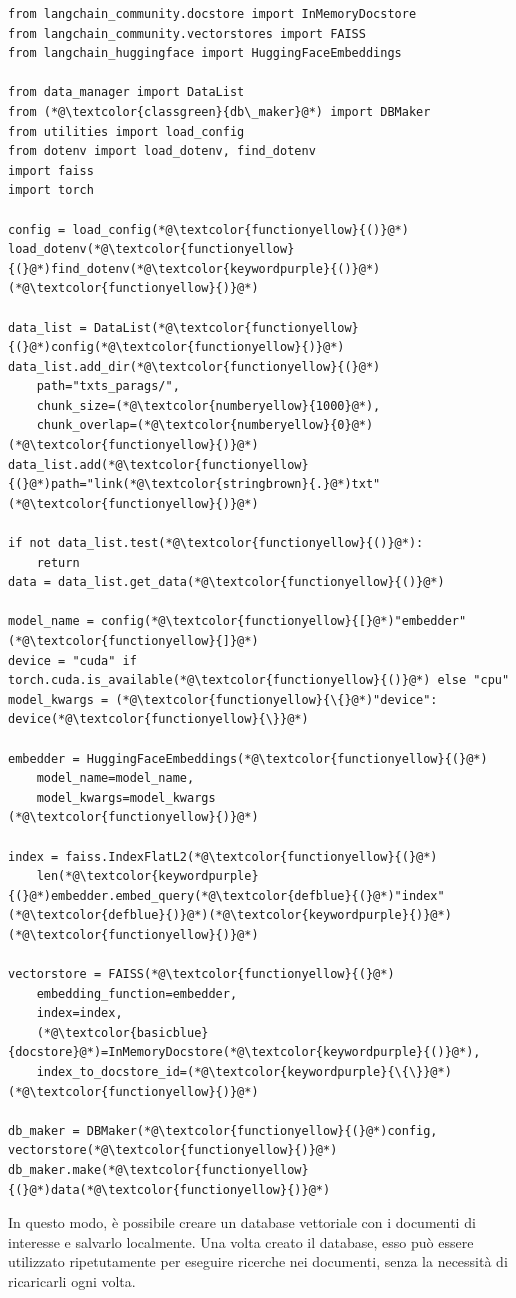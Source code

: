 \begin{lstlisting}[label=lst:loaddb, caption={Procedura di caricamento con DB Maker}]
from langchain_community.docstore import InMemoryDocstore
from langchain_community.vectorstores import FAISS
from langchain_huggingface import HuggingFaceEmbeddings

from data_manager import DataList
from (*@\textcolor{classgreen}{db\_maker}@*) import DBMaker
from utilities import load_config
from dotenv import load_dotenv, find_dotenv
import faiss
import torch
 
config = load_config(*@\textcolor{functionyellow}{()}@*)
load_dotenv(*@\textcolor{functionyellow}{(}@*)find_dotenv(*@\textcolor{keywordpurple}{()}@*)(*@\textcolor{functionyellow}{)}@*)

data_list = DataList(*@\textcolor{functionyellow}{(}@*)config(*@\textcolor{functionyellow}{)}@*)
data_list.add_dir(*@\textcolor{functionyellow}{(}@*)
    path="txts_parags/",
    chunk_size=(*@\textcolor{numberyellow}{1000}@*),
    chunk_overlap=(*@\textcolor{numberyellow}{0}@*)
(*@\textcolor{functionyellow}{)}@*)
data_list.add(*@\textcolor{functionyellow}{(}@*)path="link(*@\textcolor{stringbrown}{.}@*)txt"(*@\textcolor{functionyellow}{)}@*)

if not data_list.test(*@\textcolor{functionyellow}{()}@*):
    return
data = data_list.get_data(*@\textcolor{functionyellow}{()}@*)

model_name = config(*@\textcolor{functionyellow}{[}@*)"embedder"(*@\textcolor{functionyellow}{]}@*)
device = "cuda" if torch.cuda.is_available(*@\textcolor{functionyellow}{()}@*) else "cpu"
model_kwargs = (*@\textcolor{functionyellow}{\{}@*)"device": device(*@\textcolor{functionyellow}{\}}@*)

embedder = HuggingFaceEmbeddings(*@\textcolor{functionyellow}{(}@*)
    model_name=model_name,
    model_kwargs=model_kwargs
(*@\textcolor{functionyellow}{)}@*)

index = faiss.IndexFlatL2(*@\textcolor{functionyellow}{(}@*)
    len(*@\textcolor{keywordpurple}{(}@*)embedder.embed_query(*@\textcolor{defblue}{(}@*)"index"(*@\textcolor{defblue}{)}@*)(*@\textcolor{keywordpurple}{)}@*)
(*@\textcolor{functionyellow}{)}@*)

vectorstore = FAISS(*@\textcolor{functionyellow}{(}@*)
    embedding_function=embedder,
    index=index,
    (*@\textcolor{basicblue}{docstore}@*)=InMemoryDocstore(*@\textcolor{keywordpurple}{()}@*),
    index_to_docstore_id=(*@\textcolor{keywordpurple}{\{\}}@*)
(*@\textcolor{functionyellow}{)}@*)

db_maker = DBMaker(*@\textcolor{functionyellow}{(}@*)config, vectorstore(*@\textcolor{functionyellow}{)}@*)
db_maker.make(*@\textcolor{functionyellow}{(}@*)data(*@\textcolor{functionyellow}{)}@*)
\end{lstlisting}
In questo modo, è possibile creare un database vettoriale con i documenti di interesse e salvarlo localmente. Una volta creato il database, esso può essere utilizzato ripetutamente per eseguire ricerche nei documenti, senza la necessità di ricaricarli ogni volta.

